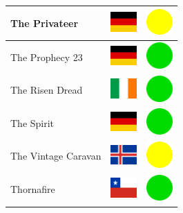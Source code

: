\documentclass[12pt, a4paper, twoside]{report}
\begin{document}
\begin{center}
\begin{longtable}{|p{5cm}|p{2cm}|p{2cm}|}
			The Privateer & \includegraphics[width=1cm]{4x3/de} & \includegraphics[width=1cm]{likes/m} \\ \hline
			The Prophecy 23 & \includegraphics[width=1cm]{4x3/de} & \includegraphics[width=1cm]{likes/y} \\ \hline
			The Risen Dread & \includegraphics[width=1cm]{4x3/ie} & \includegraphics[width=1cm]{likes/y} \\ \hline
			The Spirit & \includegraphics[width=1cm]{4x3/de} & \includegraphics[width=1cm]{likes/y} \\ \hline
			The Vintage Caravan & \includegraphics[width=1cm]{4x3/is} & \includegraphics[width=1cm]{likes/m} \\ \hline
			Thornafire & \includegraphics[width=1cm]{4x3/cl} & \includegraphics[width=1cm]{likes/y} \\ \hline

\end{longtable}
\end{center}
\end{document}
